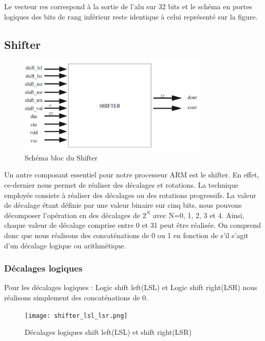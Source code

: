\documentclass[10pt,a4paper]{article}
\begin{document}
			Le vecteur res correspond à la sortie de l'alu sur 32 bits et le schéma en portes logiques 
			des bits de rang inférieur reste identique à celui représenté sur la figure.

		\subsection{Shifter}															%
			\begin{figure}[H]															%
				\centering 																%
				\includegraphics[width=0.8\textwidth]{shifter.png} 						%
				\caption{Schéma bloc du Shifter}												%
				\label{Fig.main2} 														%
			\end{figure}
			
			Un autre composant essentiel pour notre processeur ARM est le shifter. En effet, 
			ce-dernier nous permet de réaliser des décalages et rotations. La technique employée consiste à 
			réaliser des décalages ou des rotations progressifs. La valeur de décalage étant définie par une 
			valeur binaire sur cinq bits, nous pouvons décomposer l'opération en des décalages de $2^N$  avec
			N=0, 1, 2, 3 et 4. Ainsi, chaque valeur de décalage comprise entre 0 et 31 peut être réalisée. 
			On comprend donc que nous réalisons des concaténations de 0 ou 1 en fonction de s'il s'agit 
			d'un décalage logique ou arithmétique. 
			
			\subsubsection{Décalages logiques}												%
	         	Pour les décalages logiques : Logic shift left(LSL) et Logic shift right(LSR) 
				nous réalisons simplement des concaténations de 0. 
				
				\begin{figure}[H]															%
					\centering 																%
					\texttt{[image: shifter\_lsl\_lsr.png]}				%
					\caption{Décalages logiques shift left(LSL) et shift right(LSR) }		%
					\label{Fig.main2} 														%
				\end{figure}
\end{document}
